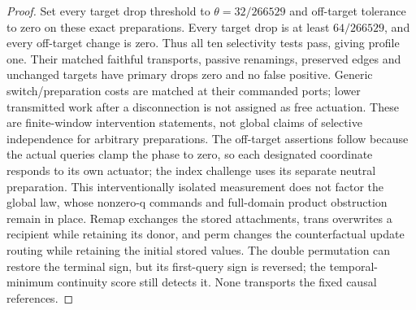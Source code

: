 \documentclass[11pt,a4paper]{article}
\theoremstyle{definition}
\begin{document}
\begin{proof}
Set every target drop threshold to $\theta=32/266529$ and off-target tolerance
to zero on these exact preparations. Every target drop is at least
$64/266529$, and every off-target change is zero. Thus all ten selectivity
tests pass, giving profile one. Their matched faithful transports, passive
renamings, preserved edges and unchanged targets have primary drops zero and
no false positive. Generic switch/preparation costs are matched at their
commanded ports; lower transmitted work after a disconnection is not assigned
as free actuation. These are finite-window intervention statements, not
global claims of selective independence for arbitrary preparations.
The off-target assertions follow because the actual queries clamp the phase
to zero, so each designated coordinate responds to its own actuator; the index
challenge uses its separate neutral preparation. This interventionally isolated
measurement does not factor the global law, whose nonzero-q commands and
full-domain product obstruction remain in place.
Remap exchanges the stored attachments, trans overwrites a recipient while
retaining its donor, and perm changes the counterfactual update routing while
retaining the initial stored values. The double permutation can restore the
terminal sign, but its first-query sign is reversed; the temporal-minimum
continuity score still detects it. None transports the fixed causal references.
\end{proof}
\end{document}

